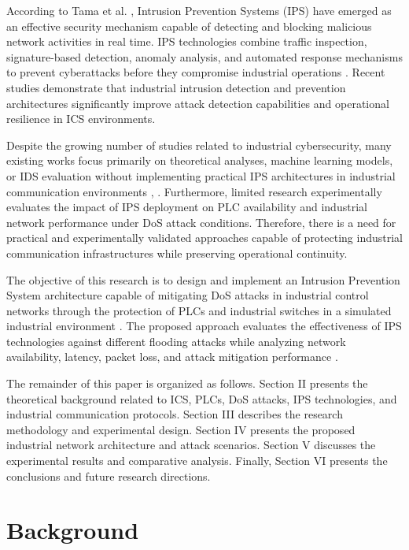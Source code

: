 \documentclass[sigconf]{acmart}
\begin{document}
According to Tama et al. \cite{Tama2022IDS}, Intrusion Prevention Systems (IPS) have emerged as an effective security mechanism capable of detecting and blocking malicious network activities in real time. IPS technologies combine traffic inspection, signature-based detection, anomaly analysis, and automated response mechanisms to prevent cyberattacks before they compromise industrial operations \cite{Varghese2022DigitalTwinIDS}. Recent studies demonstrate that industrial intrusion detection and prevention architectures significantly improve attack detection capabilities and operational resilience in ICS environments.

Despite the growing number of studies related to industrial cybersecurity, many existing works focus primarily on theoretical analyses, machine learning models, or IDS evaluation without implementing practical IPS architectures in industrial communication environments \cite{Makrakis2021ICS}, \cite{Bhamare2020ICS}. Furthermore, limited research experimentally evaluates the impact of IPS deployment on PLC availability and industrial network performance under DoS attack conditions. Therefore, there is a need for practical and experimentally validated approaches capable of protecting industrial communication infrastructures while preserving operational continuity.

The objective of this research is to design and implement an Intrusion Prevention System architecture capable of mitigating DoS attacks in industrial control networks through the protection of PLCs and industrial switches in a simulated industrial environment \cite{Pan2020PLC}. The proposed approach evaluates the effectiveness of IPS technologies against different flooding attacks while analyzing network availability, latency, packet loss, and attack mitigation performance \cite{Yu2019Ethernet}.

The remainder of this paper is organized as follows. Section II presents the theoretical background related to ICS, PLCs, DoS attacks, IPS technologies, and industrial communication protocols. Section III describes the research methodology and experimental design. Section IV presents the proposed industrial network architecture and attack scenarios. Section V discusses the experimental results and comparative analysis. Finally, Section VI presents the conclusions and future research directions.

\section{Background}
\end{document}
